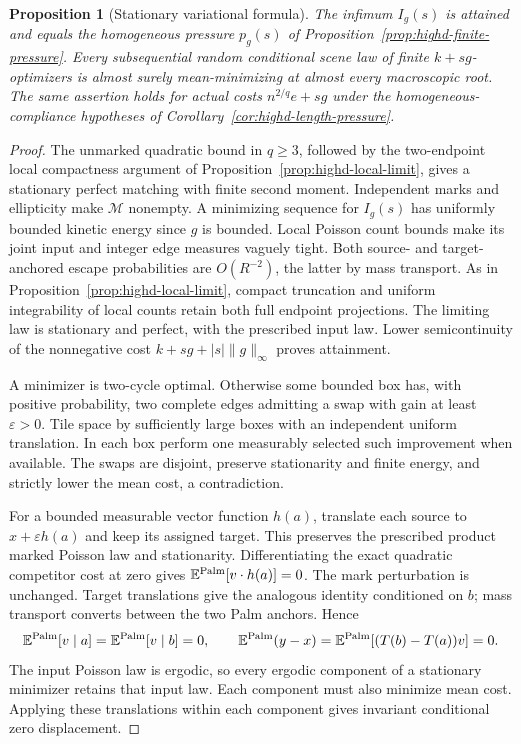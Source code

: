 \documentclass[11pt,reqno]{amsart}
\newtheorem{proposition}[theorem]{Proposition}
\theoremstyle{definition}
\theoremstyle{remark}
\numberwithin{equation}{section}
\newcommand{\E}{\mathbb E}
\begin{document}
\begin{proposition}[Stationary variational formula]
\label{prop:highd-stationary-pressure}
The infimum \(I_g(s)\) is attained and equals the homogeneous
pressure \(p_g(s)\) of Proposition~\ref{prop:highd-finite-pressure}.
Every subsequential random conditional scene law of finite
\(k+s g\)-optimizers is almost surely mean-minimizing at almost
every macroscopic root. The same assertion holds for actual costs \(n^{2/q}e+s g\) under the
homogeneous-compliance hypotheses
of Corollary~\ref{cor:highd-length-pressure}.
\end{proposition}

\begin{proof}
The unmarked quadratic bound in \(q\ge3\), followed by the
two-endpoint local compactness argument of
Proposition~\ref{prop:highd-local-limit}, gives a stationary perfect
matching with finite second moment. Independent marks and ellipticity
make \(\mathcal M\) nonempty. A minimizing sequence for \(I_g(s)\)
has uniformly bounded kinetic energy since \(g\) is bounded.
Local Poisson count bounds make its joint input and integer edge
measures vaguely tight. Both source- and target-anchored escape
probabilities are \(O(R^{-2})\), the latter by mass transport.
As in Proposition~\ref{prop:highd-local-limit}, compact truncation
and uniform integrability of local counts retain both full endpoint
projections. The limiting law is stationary and perfect, with the
prescribed input law. Lower semicontinuity of the nonnegative cost
\(k+s g+|s|\|g\|_\infty\) proves attainment.

A minimizer is two-cycle optimal. Otherwise some bounded box has,
with positive probability, two complete edges admitting a swap
with gain at least \(\varepsilon>0\). Tile space by sufficiently
large boxes with an independent uniform translation. In each box
perform one measurably selected such improvement when available.
The swaps are disjoint, preserve stationarity and finite energy,
and strictly lower the mean cost, a contradiction.

For a bounded measurable vector function \(h(a)\), translate each
source to \(x+\varepsilon h(a)\) and keep its assigned target.
This preserves the prescribed product marked Poisson law and
stationarity. Differentiating the exact quadratic competitor cost
at zero gives \(\E^{\rm Palm}[v\cdot h(a)]=0\).
The mark perturbation is unchanged. Target translations give the
analogous identity conditioned on \(b\); mass transport converts
between the two Palm anchors. Hence
\[
\E^{\rm Palm}[v\mid a]=\E^{\rm Palm}[v\mid b]=0,
\qquad
\E^{\rm Palm}(y-x)
 =\E^{\rm Palm}[(T(b)-T(a))v]=0.
\]
The input Poisson law is ergodic, so every ergodic component of a
stationary minimizer retains that input law. Each component must
also minimize mean cost. Applying these translations within each
component gives invariant conditional zero displacement.


\end{proof}
\end{document}
